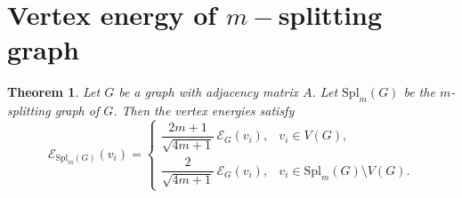 \documentclass[12pt]{article}
\theoremstyle{plain}
\newtheorem{theorem}{Theorem}
\theoremstyle{remark}
\theoremstyle{definition}
\begin{document}

\section{Vertex energy of $m-$splitting graph}
\begin{theorem}\label{thm1}
	Let $G$ be a graph with adjacency matrix $A$. Let $\mathrm{Spl}_m(G)$ be the $m$-splitting graph of $G$. Then the vertex energies satisfy
	\[
	\mathcal{E}_{\mathrm{Spl}_m(G)}(v_i)=
	\begin{cases}
		\dfrac{2m+1}{\sqrt{4m+1}}\,\mathcal{E}_G(v_i), & v_i\in V(G),\\[8pt]
		\dfrac{2}{\sqrt{4m+1}}\,\mathcal{E}_G(v_i), & v_i\in \mathrm{Spl}_m(G)\setminus V(G).
	\end{cases}
	\]
\end{theorem}
\end{document}
